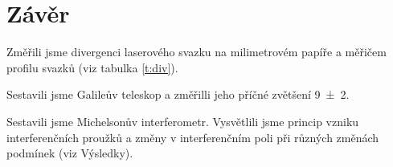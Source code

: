 \section*{Závěr}
Změřili jsme divergenci laserového svazku na milimetrovém papíře a měřičem profilu svazků (viz tabulka \ref{t:div}).

Sestavili jsme Galileův teleskop a změřilli jeho příčné zvětšení \num{9(2)}.

Sestavili jsme Michelsonův interferometr. Vysvětlili jsme princip vzniku interferenčních proužků a změny v interferenčním poli při různých změnách podmínek (viz Výsledky).
